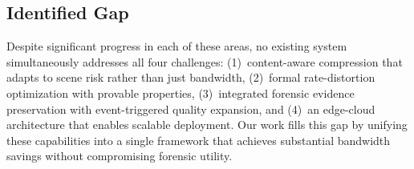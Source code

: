 \subsection{Identified Gap}

Despite significant progress in each of these areas, no existing system simultaneously addresses all four challenges: (1)~content-aware compression that adapts to scene risk rather than just bandwidth, (2)~formal rate-distortion optimization with provable properties, (3)~integrated forensic evidence preservation with event-triggered quality expansion, and (4)~an edge-cloud architecture that enables scalable deployment. Our work fills this gap by unifying these capabilities into a single framework that achieves substantial bandwidth savings without compromising forensic utility.
